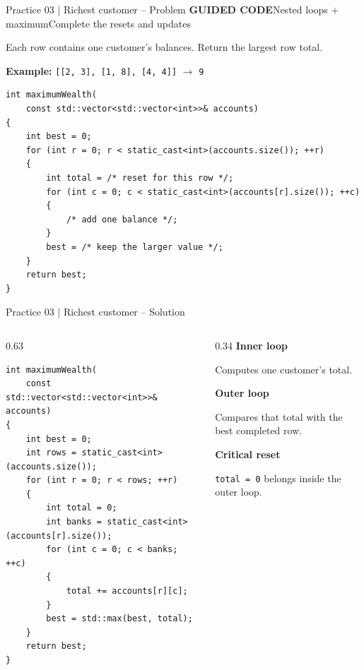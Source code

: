 \documentclass[10pt,aspectratio=169]{beamer}
\newcommand{\problemmeta}[2]{%
 {\color{BootcampBlue}\small\textbf{GUIDED CODE}\quad #1\hfill #2}\par\smallskip\small}
\newcommand{\explain}[2]{%
 {\color{BootcampBlueDark}\textbf{#1}}\par #2\par\medskip}
\begin{document}
\begin{frame}[fragile]{Practice 03 | Richest customer -- Problem}
\problemmeta{Nested loops + maximum}{Complete the resets and updates}
Each row contains one customer's balances. Return the largest row total.
\smallskip\par
\textbf{Example:} \texttt{[[2, 3], [1, 8], [4, 4]]} $\to$ \texttt{9}
\begin{lstlisting}[style=tinycpp]
int maximumWealth(
    const std::vector<std::vector<int>>& accounts)
{
    int best = 0;
    for (int r = 0; r < static_cast<int>(accounts.size()); ++r)
    {
        int total = /* reset for this row */;
        for (int c = 0; c < static_cast<int>(accounts[r].size()); ++c)
        {
            /* add one balance */;
        }
        best = /* keep the larger value */;
    }
    return best;
}
\end{lstlisting}
\end{frame}

\begin{frame}[fragile]{Practice 03 | Richest customer -- Solution}
\begin{columns}[T,onlytextwidth]
\begin{column}{0.63\textwidth}
\begin{lstlisting}[style=tinycpp]
int maximumWealth(
    const std::vector<std::vector<int>>& accounts)
{
    int best = 0;
    int rows = static_cast<int>(accounts.size());
    for (int r = 0; r < rows; ++r)
    {
        int total = 0;
        int banks = static_cast<int>(accounts[r].size());
        for (int c = 0; c < banks; ++c)
        {
            total += accounts[r][c];
        }
        best = std::max(best, total);
    }
    return best;
}
\end{lstlisting}
\end{column}
\begin{column}{0.34\textwidth}
\small
\explain{Inner loop}{Computes one customer's total.}
\explain{Outer loop}{Compares that total with the best completed row.}
\explain{Critical reset}{\texttt{total = 0} belongs inside the outer loop.}
\end{column}
\end{columns}
\end{frame}
\end{document}
